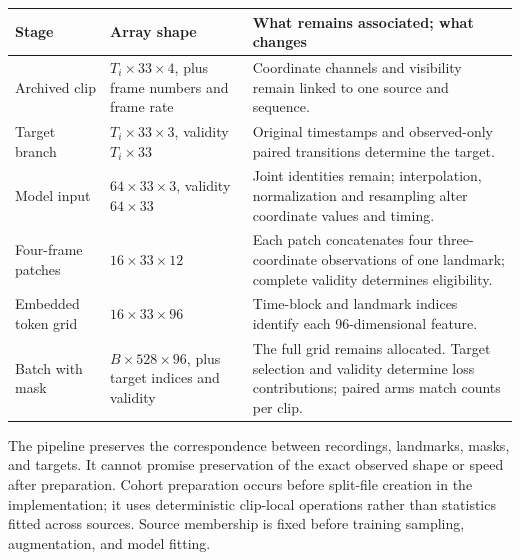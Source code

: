 \documentclass{article}
\begin{document}
\begin{table}[htbp]
\centering
\small
\begin{tabular}{@{}
  >{\raggedright\arraybackslash}p{}
  >{\raggedright\arraybackslash}p{}
  >{\raggedright\arraybackslash}p{}@{}}
\toprule\noalign{}
\begin{minipage}[b]{\linewidth}\raggedright
Stage
\end{minipage} & \begin{minipage}[b]{\linewidth}\raggedright
Array shape
\end{minipage} & \begin{minipage}[b]{\linewidth}\raggedright
What remains associated; what changes
\end{minipage} \\
\midrule\noalign{}

Archived clip & \(T_i\times33\times4\), plus frame numbers and frame rate & Coordinate channels and visibility remain linked to one source and sequence. \\
Target branch & \(T_i\times33\times3\), validity \(T_i\times33\) & Original timestamps and observed-only paired transitions determine the target. \\
Model input & \(64\times33\times3\), validity \(64\times33\) & Joint identities remain; interpolation, normalization and resampling alter coordinate values and timing. \\
Four-frame patches & \(16\times33\times12\) & Each patch concatenates four three-coordinate observations of one landmark; complete validity determines eligibility. \\
Embedded token grid & \(16\times33\times96\) & Time-block and landmark indices identify each 96-dimensional feature. \\
Batch with mask & \(B\times528\times96\), plus target indices and validity & The full grid remains allocated. Target selection and validity determine loss contributions; paired arms match counts per clip. \\
\bottomrule
\end{tabular}
\end{table}

The pipeline preserves the correspondence between recordings, landmarks, masks, and targets. It cannot promise preservation of the exact observed shape or speed after preparation. Cohort preparation occurs before split-file creation in the implementation; it uses deterministic clip-local operations rather than statistics fitted across sources. Source membership is fixed before training sampling, augmentation, and model fitting.
\end{document}
